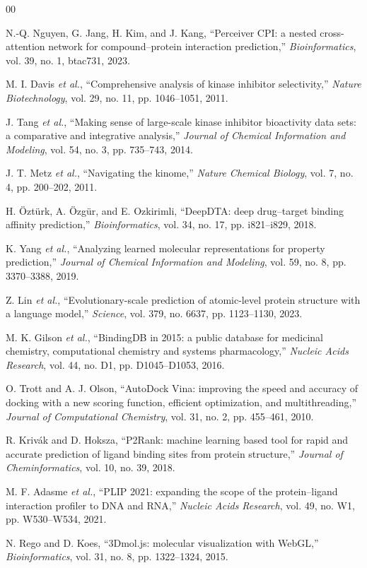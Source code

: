 \documentclass[conference]{IEEEtran}
\begin{document}
\begin{thebibliography}{00}

 N.-Q. Nguyen, G. Jang, H. Kim, and J. Kang, ``Perceiver CPI: a nested
cross-attention network for compound--protein interaction prediction,'' \emph{Bioinformatics},
vol. 39, no. 1, btac731, 2023.

 M. I. Davis \emph{et al.}, ``Comprehensive analysis of kinase inhibitor
selectivity,'' \emph{Nature Biotechnology}, vol. 29, no. 11, pp. 1046--1051, 2011.

 J. Tang \emph{et al.}, ``Making sense of large-scale kinase inhibitor bioactivity
data sets: a comparative and integrative analysis,'' \emph{Journal of Chemical Information and
Modeling}, vol. 54, no. 3, pp. 735--743, 2014.

 J. T. Metz \emph{et al.}, ``Navigating the kinome,'' \emph{Nature Chemical
Biology}, vol. 7, no. 4, pp. 200--202, 2011.

 H. Öztürk, A. Özgür, and E. Ozkirimli, ``DeepDTA: deep drug--target binding
affinity prediction,'' \emph{Bioinformatics}, vol. 34, no. 17, pp. i821--i829, 2018.

 K. Yang \emph{et al.}, ``Analyzing learned molecular representations for property
prediction,'' \emph{Journal of Chemical Information and Modeling}, vol. 59, no. 8, pp. 3370--3388,
2019.

 Z. Lin \emph{et al.}, ``Evolutionary-scale prediction of atomic-level protein
structure with a language model,'' \emph{Science}, vol. 379, no. 6637, pp. 1123--1130, 2023.

 M. K. Gilson \emph{et al.}, ``BindingDB in 2015: a public database for medicinal
chemistry, computational chemistry and systems pharmacology,'' \emph{Nucleic Acids Research},
vol. 44, no. D1, pp. D1045--D1053, 2016.

 O. Trott and A. J. Olson, ``AutoDock Vina: improving the speed and accuracy of
docking with a new scoring function, efficient optimization, and multithreading,'' \emph{Journal of
Computational Chemistry}, vol. 31, no. 2, pp. 455--461, 2010.

 R. Krivák and D. Hoksza, ``P2Rank: machine learning based tool for rapid and
accurate prediction of ligand binding sites from protein structure,'' \emph{Journal of
Cheminformatics}, vol. 10, no. 39, 2018.

 M. F. Adasme \emph{et al.}, ``PLIP 2021: expanding the scope of the
protein--ligand interaction profiler to DNA and RNA,'' \emph{Nucleic Acids Research}, vol. 49,
no. W1, pp. W530--W534, 2021.

 N. Rego and D. Koes, ``3Dmol.js: molecular visualization with WebGL,''
\emph{Bioinformatics}, vol. 31, no. 8, pp. 1322--1324, 2015.

\end{thebibliography}
\end{document}

